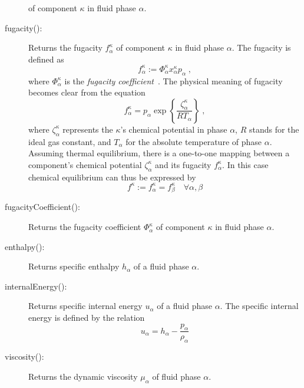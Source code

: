 \begin{description}
  of component $\kappa$ in fluid phase $\alpha$.
\item[fugacity():] Returns the fugacity $f^\kappa_\alpha$ of component
  $\kappa$ in fluid phase $\alpha$. The fugacity is defined as
  \[
  f_\alpha^\kappa := \Phi^\kappa_\alpha x^\kappa_\alpha p_\alpha \;,
  \]
  where $\Phi^\kappa_\alpha$ is the {\em fugacity
    coefficient}~\cite{reid1987}.  The physical meaning of fugacity
  becomes clear from the equation
  \[
  f_\alpha^\kappa = p_\alpha \exp\left\{\frac{\zeta^\kappa_\alpha}{R T_\alpha} \right\} \;,
  \]
  where $\zeta^\kappa_\alpha$ represents the $\kappa$'s chemical
  potential in phase $\alpha$, $R$ stands for the ideal gas constant,
  and $T_\alpha$ for the absolute temperature of phase
  $\alpha$. Assuming thermal equilibrium, there is a one-to-one
  mapping between a component's chemical potential
  $\zeta^\kappa_\alpha$ and its fugacity $f^\kappa_\alpha$. In this
  case chemical equilibrium can thus be expressed by
  \[
  f^\kappa := f^\kappa_\alpha = f^\kappa_\beta\quad\forall \alpha, \beta
  \]
\item[fugacityCoefficient():] Returns the fugacity coefficient
  $\Phi^\kappa_\alpha$ of component $\kappa$ in fluid phase $\alpha$.
\item[enthalpy():] Returns specific enthalpy $h_\alpha$ of a fluid
  phase $\alpha$.
\item[internalEnergy():] Returns specific internal energy $u_\alpha$
  of a fluid phase $\alpha$. The specific internal energy is defined
  by the relation
  \[
  u_\alpha = h_\alpha - \frac{p_\alpha}{\rho_\alpha}
  \]
\item[viscosity():] Returns the dynamic viscosity
  $\mu_\alpha$ of fluid phase $\alpha$.
\end{description}

